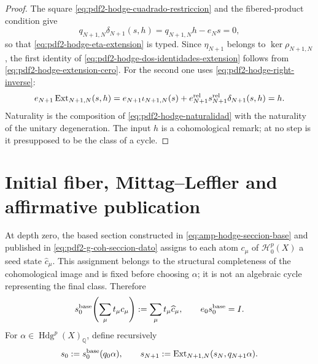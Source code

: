 \begin{proof}
The square \eqref{eq:pdf2-hodge-cuadrado-restriccion} and the fibered-product
condition give
\[
 q_{N+1,N}\delta_{N+1}(s,h)
 =q_{N+1,N}h-e_Ns=0,
\]
so that \eqref{eq:pdf2-hodge-eta-extension} is typed. Since
$\eta_{N+1}$ belongs to $\ker\rho_{N+1,N}$, the first identity of
\eqref{eq:pdf2-hodge-dos-identidades-extension} follows from
\eqref{eq:pdf2-hodge-extension-cero}. For the second one uses
\eqref{eq:pdf2-hodge-right-inverse}:
\[
 e_{N+1}\operatorname{Ext}_{N+1,N}(s,h)
 =e_{N+1}\iota_{N+1,N}(s)
  +e_{N+1}^{\rm rel}s_{N+1}^{\rm rel}\delta_{N+1}(s,h)=h.
\]
Naturality is the composition of
\eqref{eq:pdf2-hodge-naturalidad} with the naturality of the unitary
degeneration. The input $h$ is a cohomological remark; at no step
is it presupposed to be the class of a cycle.
\end{proof}

\section{Initial fiber, Mittag--Leffler and affirmative publication}

At depth zero, the based section constructed in
\eqref{eq:amp-hodge-seccion-base} and published in
\eqref{eq:pdf2-g-coh-seccion-dato} assigns to each atom $c_\mu$ of
$\mathscr H_0^p(X)$ a seed state $\widehat c_\mu$. This assignment
belongs to the structural completeness of the cohomological image and is fixed
before choosing $\alpha$; it is not an algebraic cycle representing the
final class. Therefore
\begin{equation}\label{eq:pdf2-hodge-seccion-base}
 s_0^{\rm base}\!\left(\sum_\mu t_\mu c_\mu\right)
 :=\sum_\mu t_\mu\widehat c_\mu,
 \qquad e_0s_0^{\rm base}=I.
\end{equation}
For $\alpha\in\operatorname{Hdg}^p(X)_{\mathbb Q}$, define
recursively
\begin{equation}\label{eq:pdf2-hodge-recursion-alpha}
 s_0:=s_0^{\rm base}(q_0\alpha),
 \qquad
 s_{N+1}:=\operatorname{Ext}_{N+1,N}(s_N,q_{N+1}\alpha).
\end{equation}

